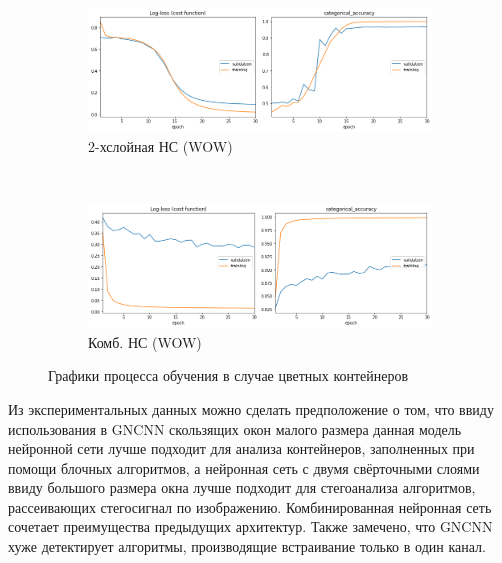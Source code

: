 \begin{figure}[p]
\bigskip
    \begin{subfigure}[b]{0.485\textwidth}
        \includegraphics[width=\textwidth]{include/graphics/experimental_plots/color/french_wow}
                                    \caption{2-хслойная НС (WOW)}
    \end{subfigure}
    ~
    \begin{subfigure}[b]{0.485\textwidth}
        \includegraphics[width=\textwidth]{include/graphics/experimental_plots/color/mixed_wow}
                                            \caption{Комб. НС (WOW)}
    \end{subfigure}

    \caption{Графики процесса обучения в случае цветных контейнеров}
    \label{fig:ColorPlots}
\end{figure}

Из экспериментальных данных можно сделать предположение о том, что ввиду использования в GNCNN скользящих окон малого размера данная модель нейронной сети лучше подходит для анализа контейнеров, заполненных при помощи блочных алгоритмов, а нейронная сеть с двумя свёрточными слоями ввиду большого размера окна лучше подходит для стегоанализа алгоритмов, рассеивающих стегосигнал по изображению. Комбинированная нейронная сеть сочетает преимущества предыдущих архитектур. Также замечено, что GNCNN хуже детектирует алгоритмы, производящие встраивание только в один канал.

\clearpage
